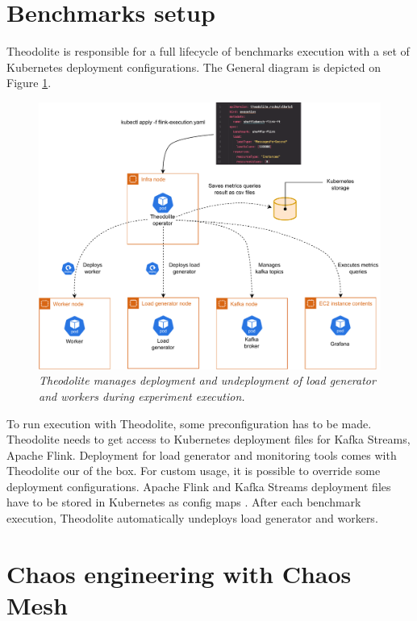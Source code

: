 \section{Benchmarks setup}\label{sec:benchamrks-setup}
Theodolite is responsible for a full lifecycle of benchmarks execution with
a set of Kubernetes deployment configurations.
The General diagram is depicted on Figure \ref{fig:theodolite-process}.

\begin{figure}[ht]
    \centering
    \includegraphics[width=1\textwidth]{figures/theodolite-process}
    \caption{\textit{Theodolite manages deployment and undeployment of load generator and workers during experiment execution.}}
    \label{fig:theodolite-process}
\end{figure}

To run execution with Theodolite, some preconfiguration has to be made.
Theodolite needs to get access to Kubernetes deployment files for Kafka Streams,
Apache Flink.
Deployment for load generator and monitoring tools comes with Theodolite our of the box.
For custom usage, it is possible to override some deployment configurations.
Apache Flink and Kafka Streams deployment files have to be stored in Kubernetes as config maps \cite{kubernetesConfigMap}.
After each benchmark execution, Theodolite automatically undeploys load generator and workers.


\section{Chaos engineering with Chaos Mesh}\label{sec:chaos-mesh}

